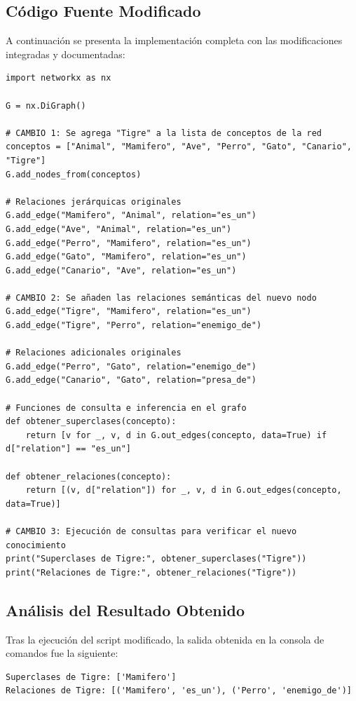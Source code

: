 \documentclass[11pt,letterpaper]{article}
\begin{document}
\subsection{Código Fuente Modificado}

A continuación se presenta la implementación completa con las modificaciones integradas y documentadas:

\begin{lstlisting}[caption={Red Semántica Modificada (Inclusión del concepto Tigre)}]
import networkx as nx

G = nx.DiGraph()

# CAMBIO 1: Se agrega "Tigre" a la lista de conceptos de la red
conceptos = ["Animal", "Mamifero", "Ave", "Perro", "Gato", "Canario", "Tigre"]
G.add_nodes_from(conceptos)

# Relaciones jerárquicas originales
G.add_edge("Mamifero", "Animal", relation="es_un")
G.add_edge("Ave", "Animal", relation="es_un")
G.add_edge("Perro", "Mamifero", relation="es_un")
G.add_edge("Gato", "Mamifero", relation="es_un")
G.add_edge("Canario", "Ave", relation="es_un")

# CAMBIO 2: Se añaden las relaciones semánticas del nuevo nodo
G.add_edge("Tigre", "Mamifero", relation="es_un")
G.add_edge("Tigre", "Perro", relation="enemigo_de")

# Relaciones adicionales originales
G.add_edge("Perro", "Gato", relation="enemigo_de")
G.add_edge("Canario", "Gato", relation="presa_de")

# Funciones de consulta e inferencia en el grafo
def obtener_superclases(concepto):
    return [v for _, v, d in G.out_edges(concepto, data=True) if d["relation"] == "es_un"]

def obtener_relaciones(concepto):
    return [(v, d["relation"]) for _, v, d in G.out_edges(concepto, data=True)]

# CAMBIO 3: Ejecución de consultas para verificar el nuevo conocimiento
print("Superclases de Tigre:", obtener_superclases("Tigre"))
print("Relaciones de Tigre:", obtener_relaciones("Tigre"))
\end{lstlisting}

\subsection{Análisis del Resultado Obtenido}
Tras la ejecución del script modificado, la salida obtenida en la consola de comandos fue la siguiente:

\begin{lstlisting}[caption={Salida en consola de la Red Semántica modificada}]
Superclases de Tigre: ['Mamifero']
Relaciones de Tigre: [('Mamifero', 'es_un'), ('Perro', 'enemigo_de')]
\end{lstlisting}
\end{document}
